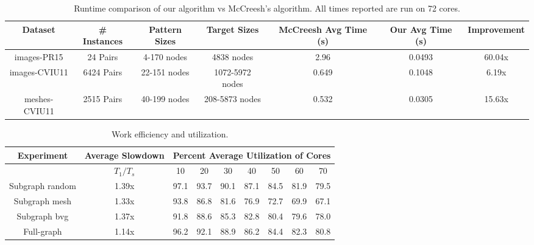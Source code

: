 %
\begin{table*}[t]
  \centering
  \begin{tabular}{|| c || c | c | c | c | c | c ||}
    \hline
    Dataset & \# Instances & Pattern Sizes & Target Sizes & McCreesh
    Avg Time (s) & Our Avg Time (s) & Improvement \\
    \hline
    \hline
    images-PR15 & 24 Pairs & 4-170 nodes & 4838 nodes & 2.96 & 0.0493 & 60.04x \\
    \hline
    images-CVIU11 & 6424 Pairs & 22-151 nodes & 1072-5972 nodes & 0.649 & 0.1048 & 6.19x \\
    \hline
    meshes-CVIU11 & 2515 Pairs & 40-199 nodes & 208-5873 nodes & 0.532 & 0.0305 & 15.63x \\ %
    \hline
  \end{tabular}
  \caption{Runtime comparison of our algorithm vs McCreesh's algorithm. All times reported
    are run on 72 cores.}
  \label{tab:comparison}
\end{table*}

%
\begin{table*}
  \centering
  \begin{tabular}{|c | c |c |c |c |c |c |c| c|}
    \hline
Experiment & Average Slowdown  & \multicolumn{7}{c|}{ Percent Average Utilization of
  Cores }
\\
\hline
& $T_1 / T_s$ & 10 & 20 & 30 & 40 & 50 & 60 & 70
\\
\hline
Subgraph random & 1.39x & 97.1 & 93.7 & 90.1 & 87.1 & 84.5 & 81.9 & 79.5
\\
\hline
Subgraph mesh & 1.33x & 93.8 & 86.8 & 81.6 & 76.9 & 72.7 & 69.9 & 67.1
\\
\hline
Subgraph bvg & 1.37x & 91.8 & 88.6 & 85.3 & 82.8 & 80.4 & 79.6 & 78.0
\\
\hline
Full-graph & 1.14x & 96.2 & 92.1 & 88.9 & 86.2 & 84.4 & 82.3 & 80.8
\\
\hline
\end{tabular}
\caption{Work efficiency and utilization.}
\label{tab:work-and-util}
\end{table*}





